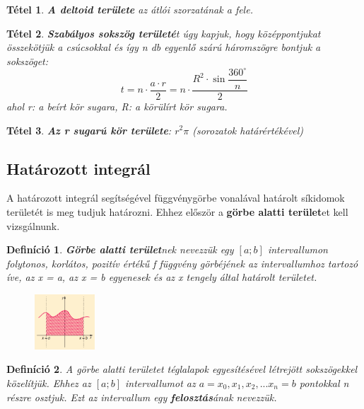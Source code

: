 \documentclass[12pt,a4paper]{article}
\newtheorem{theorem}{Tétel} [section]
\newtheorem{definition}{Definíció} [section]
\begin{document}
\begin{theorem}
\textbf{A deltoid területe} az átlói szorzatának a fele.
\end{theorem}

\begin{theorem}
\textbf{Szabályos sokszög területé}t úgy kapjuk, hogy középpontjukat összekötjük a csúcsokkal és így n db egyenlő szárú háromszögre bontjuk a sokszöget:
$$t=n\cdot \dfrac{a\cdot r}{2}=n\cdot \dfrac{R^2\cdot \sin \dfrac{360^\circ}{n}}{2}$$
ahol r: a beírt kör sugara, R: a körülírt kör sugara.
\end{theorem}

\begin{theorem}
\textbf{Az r sugarú kör területe}: $r^2\pi$ (sorozatok határértékével)
\end{theorem}

\subsection{Határozott integrál}
A határozott integrál segítségével függvénygörbe vonalával határolt síkidomok területét is meg tudjuk határozni. Ehhez először a \textbf{görbe alatti terület}et kell vizsgálnunk.
\begin{definition}
\textbf{Görbe alatti terület}nek nevezzük egy $[a; b]$ intervallumon folytonos, korlátos, pozitív értékű f függvény görbéjének az intervallumhoz tartozó íve, az x = a, az x = b egyenesek és az x tengely által határolt területet.
\begin{figure}[h]
\centering
\includegraphics[width=0.2\textwidth]{gorbe_alatti_terulet_def}
\end{figure}
\end{definition}

\begin{definition}
A görbe alatti területet téglalapok egyesítésével létrejött sokszögekkel közelítjük. Ehhez az $[a; b]$ intervallumot az $a = x_0, x_1, x_2, ... x_n = b$ pontokkal n részre osztjuk. Ezt az intervallum egy \textbf{felosztás}ának nevezzük.
\end{definition}
\end{document}

